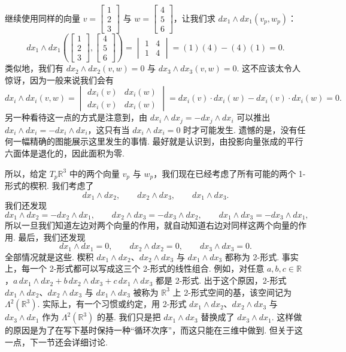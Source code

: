 继续使用同样的向量 $v=\begin{bmatrix}1\\2\\3\end{bmatrix}$ 与 $w=\begin{bmatrix}4\\5\\6\end{bmatrix}$，让我们求 $dx_1\wedge dx_1(v_p,w_p)$：
\[
dx_1\wedge dx_1\left(\begin{bmatrix}1\\2\\3\end{bmatrix},\begin{bmatrix}4\\5\\6\end{bmatrix}\right)
=\begin{vmatrix}1&4\\1&4\end{vmatrix}=(1)(4)-(4)(1)=0.
\]
类似地，我们有 $dx_2\wedge dx_2(v,w)=0$ 与 $dx_3\wedge dx_3(v,w)=0$. 这不应该太令人惊讶，因为一般来说我们会有
\[
dx_i\wedge dx_i(v,w)=
\begin{vmatrix}
dx_i(v) & dx_i(w)\\
dx_i(v) & dx_i(w)
\end{vmatrix}
=dx_i(v)\cdot dx_i(w)-dx_i(v)\cdot dx_i(w)=0.
\]
另一种看待这一点的方式是注意到，由 $dx_i\wedge dx_j=-dx_j\wedge dx_i$ 可以推出 $dx_i\wedge dx_i=-dx_i\wedge dx_i$，这只有当 $dx_i\wedge dx_i=0$ 时才可能发生. 遗憾的是，没有任何一幅精确的图能展示这里发生的事情. 最好就是认识到，由投影向量张成的平行六面体是退化的，因此面积为零.

所以，给定 $T_p\mathbb{R}^3$ 中的两个向量 $v_p$ 与 $w_p$，我们现在已经考虑了所有可能的两个 1-形式的楔积. 我们考虑了
\[
dx_1\wedge dx_2,\qquad dx_2\wedge dx_3,\qquad dx_1\wedge dx_3.
\]
我们还发现
\[
dx_1\wedge dx_2=-dx_2\wedge dx_1,\qquad
dx_2\wedge dx_3=-dx_3\wedge dx_2,\qquad
dx_1\wedge dx_3=-dx_3\wedge dx_1,
\]
所以一旦我们知道左边对两个向量的作用，就自动知道右边对同样这两个向量的作用. 最后，我们还发现
\[
dx_1\wedge dx_1=0,\qquad dx_2\wedge dx_2=0,\qquad dx_3\wedge dx_3=0.
\]
全部情况就是这些. 楔积 $dx_1\wedge dx_2$、$dx_2\wedge dx_3$ 与 $dx_1\wedge dx_3$ 都称为 2-形式. 事实上，每一个 2-形式都可以写成这三个 2-形式的线性组合. 例如，对任意 $a,b,c\in\mathbb{R}$，$a\,dx_1\wedge dx_2+b\,dx_2\wedge dx_3+c\,dx_1\wedge dx_3$ 都是 2-形式. 出于这个原因，2-形式 $dx_1\wedge dx_2$、$dx_2\wedge dx_3$ 与 $dx_1\wedge dx_3$ 被称为 $\mathbb{R}^3$ 上 2-形式空间的基，该空间记为 $\Lambda^2(\mathbb{R}^3)$. 实际上，有一个习惯或约定，用 2-形式 $dx_1\wedge dx_2$、$dx_2\wedge dx_3$ 与 $dx_3\wedge dx_1$ 作为 $\Lambda^2(\mathbb{R}^3)$ 的基. 我们只是把 $dx_1\wedge dx_3$ 替换成了 $dx_3\wedge dx_1$. 这样做的原因是为了在写下基时保持一种``循环次序''，而这只能在三维中做到. 但关于这一点，下一节还会详细讨论.

